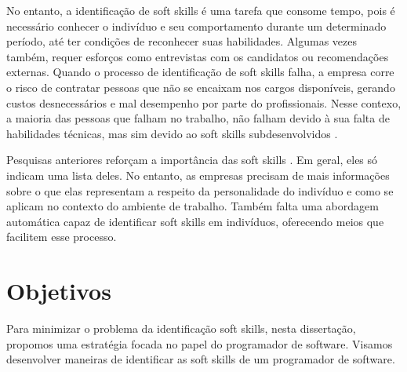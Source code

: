 No entanto, a identificação de soft skills é uma tarefa que consome tempo, pois é necessário conhecer o indivíduo e seu comportamento durante um determinado período, até ter condições de reconhecer suas habilidades. Algumas vezes também, requer esforços como entrevistas com os candidatos ou recomendações externas.
Quando o processo de identificação de soft skills falha, a empresa corre o risco de contratar pessoas que não se encaixam nos cargos disponíveis, gerando custos desnecessários e mal desempenho por parte do profissionais.
Nesse contexo, a maioria das pessoas que falham no trabalho, não falham devido à sua falta de habilidades técnicas, mas sim devido ao soft skills subdesenvolvidos \cite{bolton:86} \cite{mcgee:96}.

Pesquisas anteriores reforçam a importância das soft skills \cite {ahmed:12} \cite{sterling:03} \cite{rehman:12}.
Em geral, eles só indicam uma lista deles.
No entanto, as empresas precisam de mais informações
sobre o que elas representam a respeito da personalidade do indivíduo e como se aplicam no contexto do ambiente de trabalho.
Também falta uma abordagem automática capaz de identificar soft skills em indivíduos, oferecendo meios que facilitem esse processo.


\section{Objetivos}

Para minimizar o problema da identificação soft skills, nesta dissertação, propomos uma estratégia focada no papel do programador de software.
Visamos desenvolver maneiras de identificar as soft skills de um programador de software.


